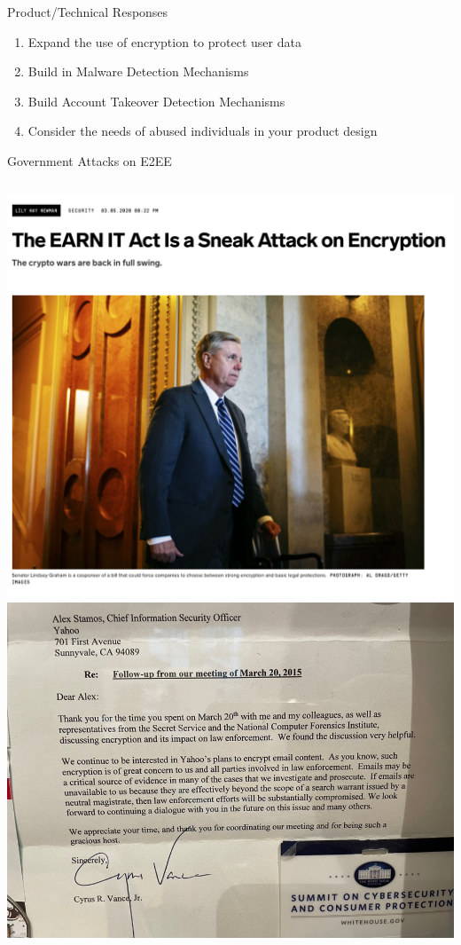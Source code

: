 \documentclass[nobackground,dvipsnames,table]{beamer}
\begin{document}
\begin{frame}{Product/Technical Responses}
    \begin{enumerate}
        \item Expand the use of encryption to protect user data
        \item Build in Malware Detection Mechanisms
        \item Build Account Takeover Detection Mechanisms
        \item Consider the needs of abused individuals in your product design
    \end{enumerate}
\end{frame}

\begin{frame}{Government Attacks on E2EE}
    \begin{columns}
            \includegraphics[width=\textwidth]{earn-it-wired}
            \includegraphics[width=\textwidth]{encryption-meeting-follow-up}
    \end{columns}
\end{frame}
\end{document}
